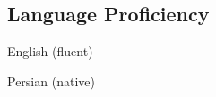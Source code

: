 \documentclass[../main.tex]{subfiles}
\begin{document}
\begin{category}
\section{Language Proficiency}
    \begin{enumerate*}[label=$\diamond$]
        \item English (fluent) \qquad \qquad \qquad
        \item Persian (native) 
    \end{enumerate*}
\end{category}
\end{document}
